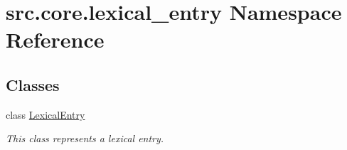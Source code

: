 \hypertarget{namespacesrc_1_1core_1_1lexical__entry}{\section{src.\+core.\+lexical\+\_\+entry Namespace Reference}
\label{namespacesrc_1_1core_1_1lexical__entry}
}
\subsection*{Classes}
\begin{DoxyCompactItemize}
\item 
class \hyperlink{classsrc_1_1core_1_1lexical__entry_1_1_lexical_entry}{Lexical\+Entry}
\begin{DoxyCompactList}\small\item\em This class represents a lexical entry. \end{DoxyCompactList}\end{DoxyCompactItemize}
